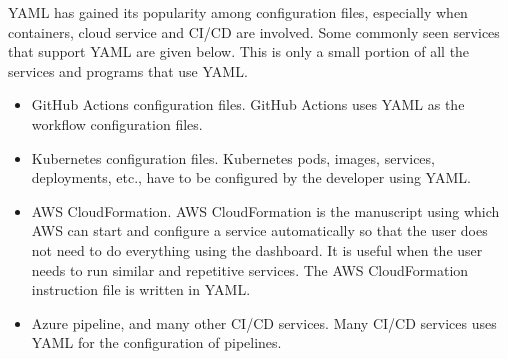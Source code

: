 YAML has gained its popularity among configuration files, especially when containers, cloud service and CI/CD are involved. Some commonly seen services that support YAML are given below. This is only a small portion of all the services and programs that use YAML.

\begin{itemize}
	\item GitHub Actions configuration files. GitHub Actions uses YAML as the workflow configuration files.
	\item Kubernetes configuration files. Kubernetes pods, images, services, deployments, etc., have to be configured by the developer using YAML.
	\item AWS CloudFormation. AWS CloudFormation is the manuscript using which AWS can start and configure a service automatically so that the user does not need to do everything using the dashboard. It is useful when the user needs to run similar and repetitive services. The AWS CloudFormation instruction file is written in YAML.
	\item Azure pipeline, and many other CI/CD services. Many CI/CD services uses YAML for the configuration of pipelines.
\end{itemize} 